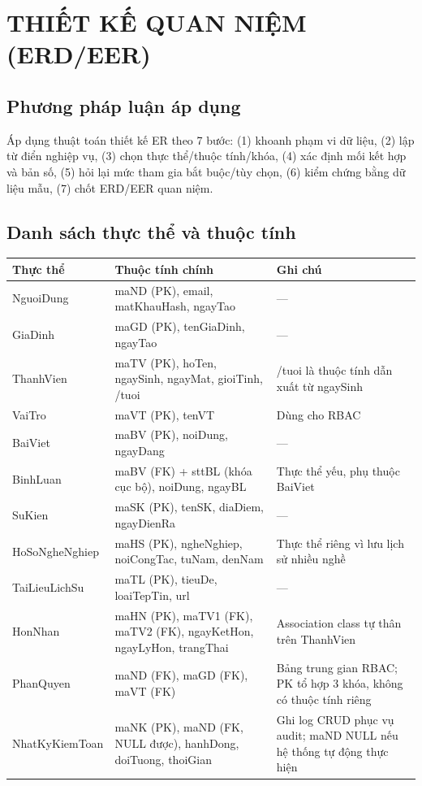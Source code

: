 \chapter{THIẾT KẾ QUAN NIỆM (ERD/EER)}

\section{Phương pháp luận áp dụng}

Áp dụng thuật toán thiết kế ER theo 7 bước: (1) khoanh phạm vi dữ liệu, (2) lập từ điển nghiệp vụ, (3) chọn thực thể/thuộc tính/khóa, (4) xác định mối kết hợp và bản số, (5) hỏi lại mức tham gia bắt buộc/tùy chọn, (6) kiểm chứng bằng dữ liệu mẫu, (7) chốt ERD/EER quan niệm.

\section{Danh sách thực thể và thuộc tính}

\begin{center}
\begin{tabularx}{\linewidth}{@{}l>{\raggedright\arraybackslash}X>{\raggedright\arraybackslash}X@{}}
\toprule
\textbf{Thực thể} & \textbf{Thuộc tính chính} & \textbf{Ghi chú} \\
\midrule
NguoiDung & maND (PK), email, matKhauHash, ngayTao & --- \\
GiaDinh & maGD (PK), tenGiaDinh, ngayTao & --- \\
ThanhVien & maTV (PK), hoTen, ngaySinh, ngayMat, gioiTinh, /tuoi & /tuoi là thuộc tính dẫn xuất từ ngaySinh \\
VaiTro & maVT (PK), tenVT & Dùng cho RBAC \\
BaiViet & maBV (PK), noiDung, ngayDang & --- \\
BinhLuan & maBV (FK) + sttBL (khóa cục bộ), noiDung, ngayBL & Thực thể yếu, phụ thuộc BaiViet \\
SuKien & maSK (PK), tenSK, diaDiem, ngayDienRa & --- \\
HoSoNgheNghiep & maHS (PK), ngheNghiep, noiCongTac, tuNam, denNam & Thực thể riêng vì lưu lịch sử nhiều nghề \\
TaiLieuLichSu & maTL (PK), tieuDe, loaiTepTin, url & --- \\
HonNhan & maHN (PK), maTV1 (FK), maTV2 (FK), ngayKetHon, ngayLyHon, trangThai & Association class tự thân trên ThanhVien \\
PhanQuyen & maND (FK), maGD (FK), maVT (FK) & Bảng trung gian RBAC; PK tổ hợp 3 khóa, không có thuộc tính riêng \\
NhatKyKiemToan & maNK (PK), maND (FK, NULL được), hanhDong, doiTuong, thoiGian & Ghi log CRUD phục vụ audit; maND NULL nếu hệ thống tự động thực hiện \\
\bottomrule
\end{tabularx}
\end{center}

